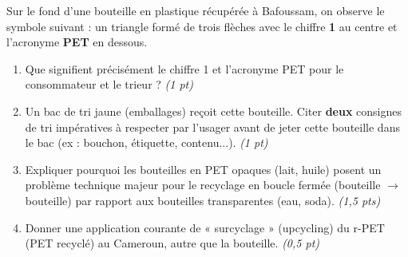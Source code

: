 \documentclass[11pt]{article}
\begin{document}
\begin{exercice}
Sur le fond d'une bouteille en plastique récupérée à Bafoussam, on observe le symbole suivant : un triangle formé de trois flèches avec le chiffre \textbf{1} au centre et l'acronyme \textbf{PET} en dessous.
\begin{enumerate}
    \item Que signifient précisément le chiffre 1 et l'acronyme PET pour le consommateur et le trieur ? \textit{(1 pt)}
    \item Un bac de tri jaune (emballages) reçoit cette bouteille. Citer \textbf{deux} consignes de tri impératives à respecter par l'usager avant de jeter cette bouteille dans le bac (ex : bouchon, étiquette, contenu...). \textit{(1 pt)}
    \item Expliquer pourquoi les bouteilles en PET opaques (lait, huile) posent un problème technique majeur pour le recyclage en boucle fermée (bouteille $\rightarrow$ bouteille) par rapport aux bouteilles transparentes (eau, soda). \textit{(1,5 pts)}
    \item Donner une application courante de « surcyclage » (upcycling) du r-PET (PET recyclé) au Cameroun, autre que la bouteille. \textit{(0,5 pt)}
\end{enumerate}
\end{exercice}
\end{document}
